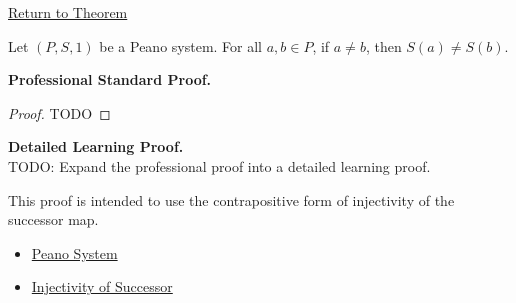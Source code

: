\newpage
{}
\label{prf:successor-inequality-reflection}

\begin{remark*}[Return]
\hyperref[thm:successor-inequality-reflection]{Return to Theorem}
\end{remark*}

\begin{theorem*}
Let $(P,S,1)$ be a Peano system. For all $a,b \in P$, if $a \neq b$, then
$S(a)\neq S(b)$.
\end{theorem*}

\textbf{Professional Standard Proof.}~\\
\begin{proof}
TODO
\end{proof}

\textbf{Detailed Learning Proof.}~\\
TODO: Expand the professional proof into a detailed learning proof.


\begin{remark*}
This proof is intended to use the contrapositive form of injectivity of the
successor map.
\end{remark*}

\begin{dependencies}
\begin{itemize}
  \item \hyperref[def:peano-system]{Peano System}
  \item \hyperref[ax:peano-successor-injective]{Injectivity of Successor}
\end{itemize}
\end{dependencies}


